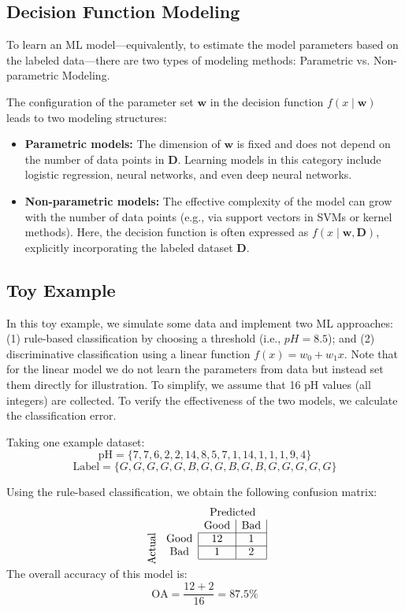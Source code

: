 \documentclass[12pt]{article}
\begin{document}
\subsection{Decision Function Modeling}
To learn an ML model—equivalently, to estimate the model parameters based on the labeled data—there are two types of modeling methods: Parametric vs. Non-parametric Modeling.

The configuration of the parameter set \(\bm{w}\) in the decision function \(f(x \mid \bm{w})\) leads to two modeling structures:
\begin{itemize}
\item \textbf{Parametric models:} The dimension of \(\bm{w}\) is fixed and does not depend on the number of data points in \(\bm{D}\). Learning models in this category include logistic regression, neural networks, and even deep neural networks.
\item \textbf{Non-parametric models:} The effective complexity of the model can grow with the number of data points (e.g., via support vectors in SVMs or kernel methods). Here, the decision function is often expressed as \(f(x \mid \bm{w}, \bm{D})\), explicitly incorporating the labeled dataset \(\bm{D}\).
\end{itemize}

\subsection{Toy Example}
In this toy example, we simulate some data and implement two ML approaches: (1) rule-based classification by choosing a threshold (i.e., \(pH = 8.5\)); and (2) discriminative classification using a linear function \(f(x) = w_0 + w_1 x\). Note that for the linear model we do not learn the parameters from data but instead set them directly for illustration. To simplify, we assume that 16 pH values (all integers) are collected. To verify the effectiveness of the two models, we calculate the classification error.

Taking one example dataset:
\[
\text{pH} = \{7, 7, 6, 2, 2, 14, 8, 5, 7, 1, 14, 1, 1, 1, 9, 4\}
\]
\[
\text{Label} = \{G, G, G, G, G,  B, G, G,  B, G,  B, G, G, G, G, G\}
\]

Using the rule-based classification, we obtain the following confusion matrix:
\[
\begin{array}{cc|c|c|}
    & \multicolumn{1}{c}{} & \multicolumn{2}{c}{\text{Predicted}} \\
    & \multicolumn{1}{c}{} & \text{Good} & \text{Bad} \\ \cline{3-4}
    \multirow{2}{*}{\rotatebox[origin=c]{90}{\text{Actual}}} & \text{Good} & 12 & 1 \\ \cline{3-4}
    & \text{Bad} & 1 & 2 \\ \cline{3-4}
\end{array}
\]
The overall accuracy of this model is:
\[
\text{OA} = \frac{12+2}{16} = 87.5\%
\]
\end{document}
